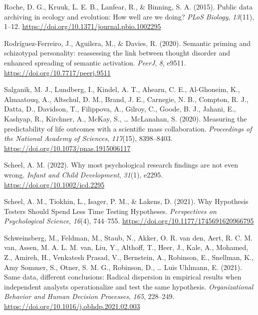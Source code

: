 \documentclass[
  letterpaper,
  DIV=11,
  numbers=noendperiod]{scrreprt}
\newlength{\cslhangindent}
\newlength{\cslentryspacingunit} %
\newenvironment{CSLReferences}[2] %
 {%
  \setlength{\parindent}{0pt}
  \ifodd #1
  \let\oldpar\par
  \def\par{\hangindent=\cslhangindent\oldpar}
  \fi
  \setlength{\parskip}{#2\cslentryspacingunit}
 }%
 {}
\begin{document}
\begin{CSLReferences}{1}{0}
\leavevmode{}%
Roche, D. G., Kruuk, L. E. B., Lanfear, R., \& Binning, S. A. (2015).
Public data archiving in ecology and evolution: How well are we doing?
\emph{PLoS Biology}, \emph{13}(11), 1--12.
\url{https://doi.org/10.1371/journal.pbio.1002295}

\leavevmode{}%
Rodríguez-Ferreiro, J., Aguilera, M., \& Davies, R. (2020). Semantic
priming and schizotypal personality: reassessing the link between
thought disorder and enhanced spreading of semantic activation.
\emph{PeerJ}, \emph{8}, e9511. \url{https://doi.org/10.7717/peerj.9511}

\leavevmode{}%
Salganik, M. J., Lundberg, I., Kindel, A. T., Ahearn, C. E., Al-Ghoneim,
K., Almaatouq, A., Altschul, D. M., Brand, J. E., Carnegie, N. B.,
Compton, R. J., Datta, D., Davidson, T., Filippova, A., Gilroy, C.,
Goode, B. J., Jahani, E., Kashyap, R., Kirchner, A., McKay, S., \ldots{}
McLanahan, S. (2020). Measuring the predictability of life outcomes with
a scientific mass collaboration. \emph{Proceedings of the National
Academy of Sciences}, \emph{117}(15), 8398--8403.
\url{https://doi.org/10.1073/pnas.1915006117}

\leavevmode{}%
Scheel, A. M. (2022). Why most psychological research findings are not
even wrong. \emph{Infant and Child Development}, \emph{31}(1), e2295.
\url{https://doi.org/10.1002/icd.2295}

\leavevmode{}%
Scheel, A. M., Tiokhin, L., Isager, P. M., \& Lakens, D. (2021). Why
Hypothesis Testers Should Spend Less Time Testing Hypotheses.
\emph{Perspectives on Psychological Science}, \emph{16}(4), 744--755.
\url{https://doi.org/10.1177/1745691620966795}

\leavevmode{}%
Schweinsberg, M., Feldman, M., Staub, N., Akker, O. R. van den, Aert, R.
C. M. van, Assen, M. A. L. M. van, Liu, Y., Althoff, T., Heer, J., Kale,
A., Mohamed, Z., Amireh, H., Venkatesh Prasad, V., Bernstein, A.,
Robinson, E., Snellman, K., Amy Sommer, S., Otner, S. M. G., Robinson,
D., \ldots{} Luis Uhlmann, E. (2021). Same data, different conclusions:
Radical dispersion in empirical results when independent analysts
operationalize and test the same hypothesis. \emph{Organizational
Behavior and Human Decision Processes}, \emph{165}, 228--249.
\url{https://doi.org/10.1016/j.obhdp.2021.02.003}


\end{CSLReferences}
\end{document}
